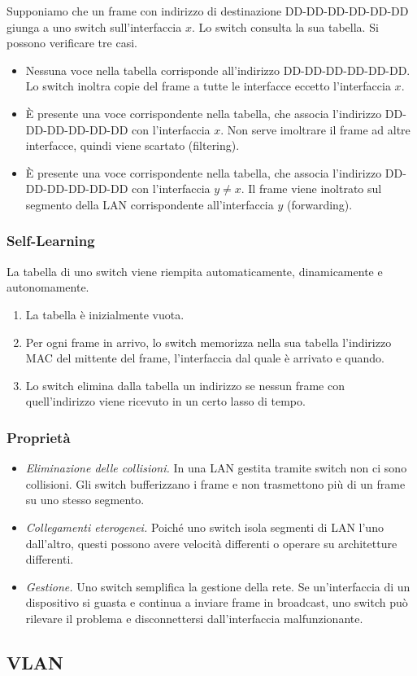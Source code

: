 \documentclass[11pt]{book}
\begin{document}
Supponiamo che un frame con indirizzo di destinazione DD-DD-DD-DD-DD-DD giunga a uno switch sull'interfaccia $x$. Lo switch 
consulta la sua tabella. Si possono verificare tre casi.
\begin{itemize}
    \item Nessuna voce nella tabella corrisponde all'indirizzo DD-DD-DD-DD-DD-DD. Lo switch inoltra copie del frame a tutte 
    le interfacce eccetto l'interfaccia $x$.
    \item È presente una voce corrispondente nella tabella, che associa l'indirizzo DD-DD-DD-DD-DD-DD con l'interfaccia 
    $x$. Non serve imoltrare il frame ad altre interfacce, quindi viene scartato (filtering).
    \item È presente una voce corrispondente nella tabella, che associa l'indirizzo DD-DD-DD-DD-DD-DD con l'interfaccia 
    $y\neq x$. Il frame viene inoltrato sul segmento della LAN corrispondente all'interfaccia $y$ (forwarding).
\end{itemize}
\subsubsection{Self-Learning}
La tabella di uno switch viene riempita automaticamente, dinamicamente e autonomamente.
\begin{enumerate}
    \item La tabella è inizialmente vuota.
    \item Per ogni frame in arrivo, lo switch memorizza nella sua tabella l'indirizzo MAC del mittente del frame, l'interfaccia 
    dal quale è arrivato e quando. 
    \item Lo switch elimina dalla tabella un indirizzo se nessun frame con quell'indirizzo viene ricevuto in un certo lasso 
    di tempo.
\end{enumerate}
\subsubsection{Proprietà}
\begin{itemize}
    \item \textit{Eliminazione delle collisioni.} In una LAN gestita tramite switch non ci sono collisioni. Gli switch 
    bufferizzano i frame e non trasmettono più di un frame su uno stesso segmento. 
    \item \textit{Collegamenti eterogenei.} Poiché uno switch isola segmenti di LAN l'uno dall'altro, questi possono avere 
    velocità differenti o operare su architetture differenti.
    \item \textit{Gestione.} Uno switch semplifica la gestione della rete. Se un'interfaccia di un dispositivo si guasta 
    e continua a inviare frame in broadcast, uno switch può rilevare il problema e disconnettersi dall'interfaccia malfunzionante.
\end{itemize}
\subsection{VLAN}
\end{document}
